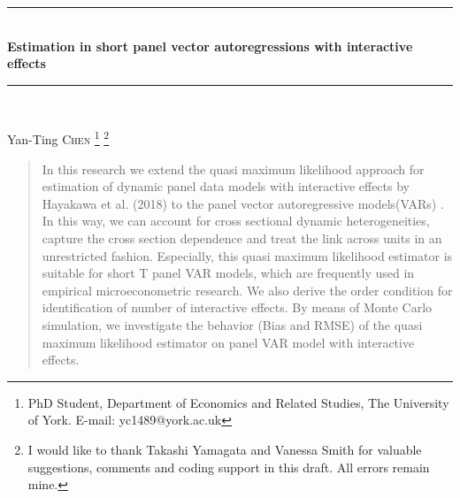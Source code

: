 \documentclass[12pt,a4paper,hyperref]{article}
\begin{document}
\begin{titlepage}

\newcommand{\HRule}{\rule{\linewidth}{0.5mm}} %

\center %





\HRule \\[0.4cm]
{ \huge \bfseries Estimation in short panel vector autoregressions  with interactive effects}\\[0.4cm] %
\HRule \\[1.5cm]




\begin{minipage}{0.4\textwidth}
\begin{flushleft} \Large
Yan-Ting \textsc{Chen} \thanks{PhD Student, Department of Economics and Related Studies, The University of York. E-mail: yc1489@york.ac.uk} \thanks{I would like to thank Takashi Yamagata and Vanessa Smith for valuable suggestions, comments and coding support in this draft. All errors remain mine. } %
\end{flushleft}
\end{minipage}


\begin{abstract}
In this research we extend the quasi maximum likelihood approach for estimation of dynamic panel data models with interactive effects by Hayakawa et al. (2018) to the panel vector autoregressive models(VARs) . In this way, we can account for cross sectional dynamic heterogeneities, capture the cross section dependence and treat the link across units in an unrestricted fashion. Especially, this quasi maximum likelihood estimator is suitable for short T panel VAR models, which are frequently used in empirical microeconometric research. We also derive the order condition for identification of number of interactive effects. By means of Monte Carlo simulation, we investigate the behavior (Bias and RMSE) of the quasi maximum likelihood estimator on panel VAR model with interactive effects.
\end{abstract}











\end{titlepage}
\end{document}
